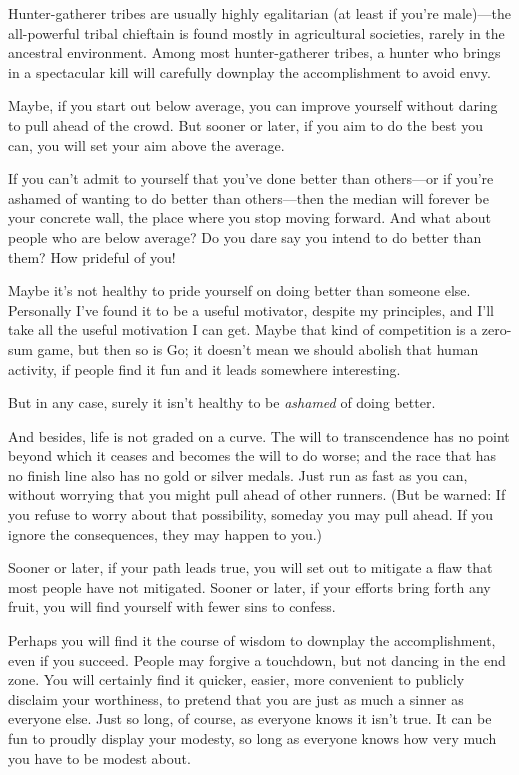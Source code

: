 \myendsectiontext


{
 Hunter-gatherer tribes are usually highly egalitarian (at least if
you're male)---the all-powerful tribal chieftain is
found mostly in agricultural societies, rarely in the ancestral
environment. Among most hunter-gatherer tribes, a hunter who brings in
a spectacular kill will carefully downplay the accomplishment to avoid
envy. }

{
 Maybe, if you start out below average, you can improve yourself
without daring to pull ahead of the crowd. But sooner or later, if you
aim to do the best you can, you will set your aim above the average.}

{
 If you can't admit to yourself that
you've done better than others---or if
you're ashamed of wanting to do better than
others---then the median will forever be your concrete wall, the place
where you stop moving forward. And what about people who are below
average? Do you dare say you intend to do better than them? How
prideful of you!}

{
 Maybe it's not healthy to pride yourself on doing
better than someone else. Personally I've found it to
be a useful motivator, despite my principles, and I'll
take all the useful motivation I can get. Maybe that kind of
competition is a zero-sum game, but then so is Go; it
doesn't mean we should abolish that human activity, if
people find it fun and it leads somewhere interesting.}

{
 But in any case, surely it isn't healthy to be
\textit{ashamed} of doing better.}

{
 And besides, life is not graded on a curve. The will to
transcendence has no point beyond which it ceases and becomes the will
to do worse; and the race that has no finish line also has no gold or
silver medals. Just run as fast as you can, without worrying that you
might pull ahead of other runners. (But be warned: If you refuse to
worry about that possibility, someday you may pull ahead. If you ignore
the consequences, they may happen to you.)}

{
 Sooner or later, if your path leads true, you will set out to
mitigate a flaw that most people have not mitigated. Sooner or later,
if your efforts bring forth any fruit, you will find yourself with
fewer sins to confess.}

{
 Perhaps you will find it the course of wisdom to downplay the
accomplishment, even if you succeed. People may forgive a touchdown,
but not dancing in the end zone. You will certainly find it quicker,
easier, more convenient to publicly disclaim your worthiness, to
pretend that you are just as much a sinner as everyone else. Just so
long, of course, as everyone knows it isn't true. It
can be fun to proudly display your modesty, so long as everyone knows
how very much you have to be modest about.}

